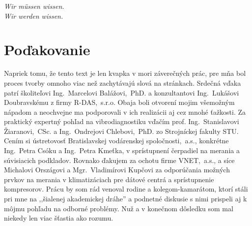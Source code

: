 \thispagestyle{empty}
\vspace*{\fill}

\begin{center}
\settowidth{}
\parbox{\longest}{
  \hrulefill\hspace{0.2cm} \decofourleft\decofourright \hspace{0.2cm} \hrulefill\par
  \raggedright{
  \itshape
  	Wir müssen wissen. \\ Wir werden wissen.\par
  }   
  \par
  \hrulefill\hspace{0.2cm} \decofourleft\decofourright\hspace{0.2cm} \hrulefill\par
}
\end{center}

\vspace*{\fill}
\section*{Poďakovanie}
{\linespread{1.0}\small Napriek tomu, že tento text je len kvapka v mori záverečných prác, pre mňa bol proces tvorby omnoho viac než zachytávajú slová na stránkach. Srdečná vďaka patrí školiteľovi Ing.~Marcelovi Balážovi,~PhD. a konzultantovi Ing.~Lukášovi Doubravskému z firmy R-DAS,~s.r.o. Obaja boli otvorení mojim všemožným nápadom a neochvejne ma podporovali v ich realizácii aj cez mnohé ťažkosti. Za praktický expertný pohľad na vibrodiagnostiku vďačím prof. Ing.~Stanislavovi Žiaranovi,~CSc. a Ing.~Ondrejovi Chlebovi,~PhD. zo Strojníckej fakulty STU. Cením si ústretovosť Bratislavskej vodárenskej spoločnosti,~a.s., konkrétne Ing.~Petra Csóku a Ing.~Petra Kmeťka, v sprístupnení čerpadiel na merania a súvisiacich podkladov. Rovnako ďakujem za ochotu firme VNET,~a.s., a síce Michalovi Országovi a Mgr.~Vladimírovi Kupčovi za odporúčania možných prvkov na merania v klimatizáciach pre dátové centrá a sprístupnenie kompresorov. Prácu by som rád venoval rodine a kolegom-kamarátom, ktorí stáli pri mne na ,,šialenej akademickej dráhe'' a podnetné diskusie s nimi prispeli aj k môjmu pohľadu na odborné problémy. Nuž a v konečnom dôsledku som mal niekedy len viac šťastia ako rozumu.}
\vspace{3cm}